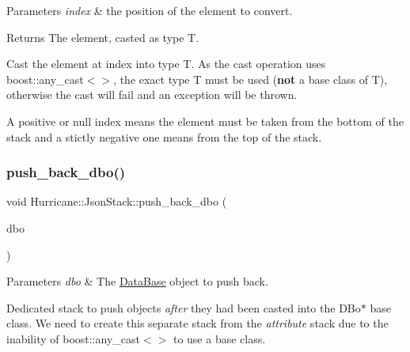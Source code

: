 \begin{DoxyParams}{Parameters}
{\em index} & the position of the element to convert. \\
\hline
\end{DoxyParams}
\begin{DoxyReturn}{Returns}
The element, casted as type T.
\end{DoxyReturn}
Cast the element at {\ttfamily index} into type T. As the cast operation uses {\ttfamily boost\+::any\+\_\+cast$<$$>$}, the exact type {\ttfamily T} must be used ({\bfseries not} a base class of {\ttfamily T}), otherwise the cast will fail and an exception will be thrown.

A positive or null index means the element must be taken from the bottom of the stack and a stictly negative one means from the top of the stack. \mbox{\label{classHurricane_1_1JsonStack_ab949c42fe63dcaad6a8e23954167a9a7}} 
\subsubsection{\texorpdfstring{push\+\_\+back\+\_\+dbo()}{push\_back\_dbo()}}
{\footnotesize\ttfamily void Hurricane\+::\+Json\+Stack\+::push\+\_\+back\+\_\+dbo (\begin{DoxyParamCaption}\item[{\hyperlink{classHurricane_1_1DBo}{D\+Bo} $\ast$}]{dbo }\end{DoxyParamCaption})\hspace{0.3cm}{\ttfamily [inline]}}


\begin{DoxyParams}{Parameters}
{\em dbo} & The \hyperlink{classHurricane_1_1DataBase}{Data\+Base} object to push back.\\
\hline
\end{DoxyParams}
Dedicated stack to push objects {\itshape after} they had been casted into the D\+Bo$\ast$ base class. We need to create this separate stack from the {\itshape attribute} stack due to the inability of {\ttfamily boost\+::any\+\_\+cast$<$$>$} to use a base class. \mbox{\label{classHurricane_1_1JsonStack_adeeb2a0300fa248f1f3bff38c4095630}} 
